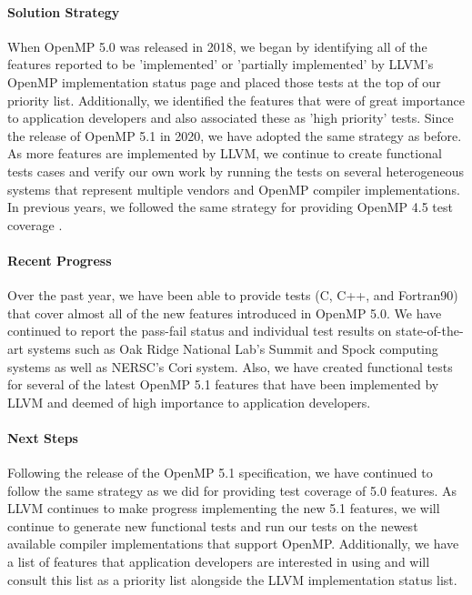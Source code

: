 \paragraph{Solution Strategy}
 When OpenMP 5.0 was released in 2018, we began by identifying all of the features reported to be 'implemented' or 'partially implemented' by LLVM's OpenMP implementation status page and placed those tests at the top of our priority list. Additionally, we identified the features that were of great importance to application developers and also associated these as 'high priority' tests. Since the release of OpenMP 5.1 in 2020, we have adopted the same strategy as before. As more features are implemented by LLVM, we continue to create functional tests cases and verify our own work by running the tests on several heterogeneous systems that represent multiple vendors and OpenMP compiler implementations. In previous years, we followed the same strategy for providing OpenMP 4.5 test coverage \cite{vandv2019}.

\paragraph{Recent Progress}
Over the past year, we have been able to provide tests (C, C++, and Fortran90) that cover almost all of the new features introduced in OpenMP 5.0. We have continued to report the pass-fail status and individual test results on state-of-the-art systems such as Oak Ridge National Lab's Summit and Spock computing systems as well as NERSC's Cori system. Also, we have created functional tests for several of the latest OpenMP 5.1 features that have been implemented by LLVM and deemed of high importance to application developers.

\paragraph{Next Steps}
Following the release of the OpenMP 5.1 specification, we have continued to follow the same strategy as we did for providing test coverage of 5.0 features. As LLVM continues to make progress implementing the new 5.1 features, we will continue to generate new functional tests and run our tests on the newest available compiler implementations that support OpenMP.  Additionally, we have a list of features that application developers are interested in using and will consult this list as a priority list alongside the LLVM implementation status list. 